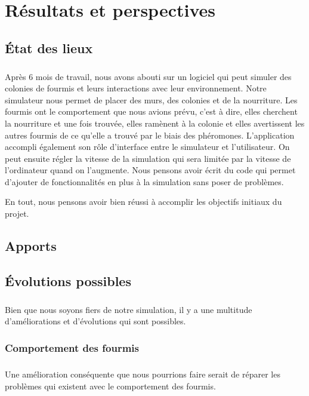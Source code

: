\documentclass{EPUProjetDi}
\begin{document}
\chapter{Résultats et perspectives}

\section{État des lieux}

\paragraph{}
Après 6 mois de travail, nous avons abouti sur un logiciel qui peut simuler des colonies de fourmis et leurs interactions avec leur environnement.
Notre simulateur nous permet de placer des murs, des colonies et de la nourriture. 
Les fourmis ont le comportement que nous avions prévu, c'est à dire, elles cherchent la nourriture et une fois trouvée, elles ramènent à la colonie et elles avertissent les 
autres fourmis de ce qu'elle a trouvé par le biais des phéromones.
L'application accompli également son rôle d'interface entre le simulateur et l'utilisateur. On peut ensuite régler la vitesse de la simulation qui sera limitée par la vitesse de l'ordinateur quand on l'augmente.
Nous pensons avoir écrit du code qui permet d'ajouter de fonctionnalités en plus à la simulation sans poser de problèmes.

En tout, nous pensons avoir bien réussi à accomplir les objectifs initiaux du projet.

\section{Apports}

\section{Évolutions possibles}

\paragraph{}
Bien que nous soyons fiers de notre simulation, il y a une multitude d'améliorations et d'évolutions qui sont possibles.

\subsection{Comportement des fourmis}
\paragraph{}
Une amélioration conséquente que nous pourrions faire serait de réparer les problèmes qui existent avec le comportement des fourmis.
\end{document}
